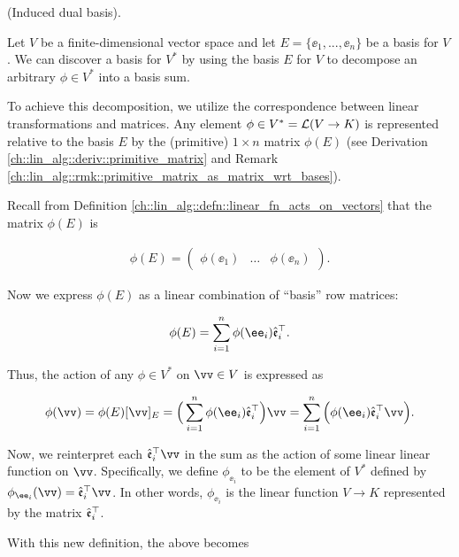 \begin{deriv}
\label{ch::motivated_intro::deriv::induced_dual_basis}
    (Induced dual basis).
    
    Let $V$ be a finite-dimensional vector space and let $E = \{\ee_1, ..., \ee_n\}$ be a basis for $V$. We can discover a basis for $V^*$ by using the basis $E$ for $V$ to decompose an arbitrary $\phi \in V^*$ into a basis sum. 
    
    To achieve this decomposition, we utilize the correspondence between linear transformations and matrices. Any element $\phi \in V^* = \mathcal{L}(V \rightarrow K)$ is represented relative to the basis $E$ by the (primitive) $1 \times n$ matrix $\phi(E)$ (see Derivation \ref{ch::lin_alg::deriv::primitive_matrix} and Remark \ref{ch::lin_alg::rmk::primitive_matrix_as_matrix_wrt_bases}).
    
    Recall from Definition \ref{ch::lin_alg::defn::linear_fn_acts_on_vectors} that the matrix $\phi(E)$ is
    
    \begin{align*}
        \phi(E)
        =
        \begin{pmatrix} 
            \phi(\ee_1) & \hdots & \phi(\ee_n)
        \end{pmatrix}.
    \end{align*}
    
    Now we express $\phi(E)$ as a linear combination of ``basis'' row matrices:
    
    \begin{align*}
        \phi(E) = \sum_{i = 1}^n \phi(\ee_i) \see_i^\top.
    \end{align*}
    
    Thus, the action of any $\phi \in V^*$ on $\vv \in V$ is expressed as

    \begin{align*}
        \phi(\vv) = \phi(E) [\vv]_E 
        = \Big( \sum_{i = 1}^n \phi(\ee_i) \see_i^\top \Big) \vv 
        = \sum_{i = 1}^n \Big( \phi(\ee_i) \see_i^\top \vv \Big).
    \end{align*}
    
    Now, we reinterpret each $\see_i^\top \vv$ in the sum as the action of some linear linear function on $\vv$. Specifically, we define $\phi_{\ee_i}$ to be the element of $V^*$ defined by $\phi_{\ee_i}(\vv) = \see_i^\top \vv$. In other words, $\phi_{\ee_i}$ is the linear function $V \rightarrow K$ represented by the matrix $\hat{\mathfrak{e}}_i^\top$.
    
    With this new definition, the above becomes
    

\end{deriv}
